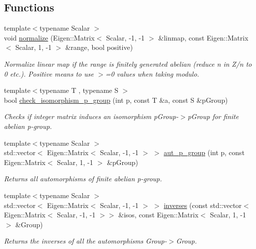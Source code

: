 \subsection*{Functions}
\begin{DoxyCompactItemize}
\item 
{\footnotesize template$<$typename Scalar $>$ }\\void \hyperlink{namespaceMackey_a5a3367c31144a61006d7c605d6e6ca38}{normalize} (Eigen\+::\+Matrix$<$ Scalar, -\/1, -\/1 $>$ \&linmap, const Eigen\+::\+Matrix$<$ Scalar, 1, -\/1 $>$ \&range, bool positive)
\begin{DoxyCompactList}\small\item\em Normalize linear map if the range is finitely generated abelian (reduce n in Z/n to 0 etc.). Positive means to use $>$=0 values when taking modulo. \end{DoxyCompactList}\item 
{\footnotesize template$<$typename T , typename S $>$ }\\bool \hyperlink{namespaceMackey_aa96cf972d89b207ce6709e867f760f37}{check\+\_\+isomorphism\+\_\+p\+\_\+group} (int p, const T \&a, const S \&p\+Group)
\begin{DoxyCompactList}\small\item\em Checks if integer matrix induces an isomorphism p\+Group-\/$>$p\+Group for finite abelian p-\/group. \end{DoxyCompactList}\item 
{\footnotesize template$<$typename Scalar $>$ }\\std\+::vector$<$ Eigen\+::\+Matrix$<$ Scalar, -\/1, -\/1 $>$ $>$ \hyperlink{namespaceMackey_ab3832e52497b387d4553af06aa26ec99}{aut\+\_\+p\+\_\+group} (int p, const Eigen\+::\+Matrix$<$ Scalar, 1, -\/1 $>$ \&p\+Group)
\begin{DoxyCompactList}\small\item\em Returns all automorphisms of finite abelian p-\/group. \end{DoxyCompactList}\item 
{\footnotesize template$<$typename Scalar $>$ }\\std\+::vector$<$ Eigen\+::\+Matrix$<$ Scalar, -\/1, -\/1 $>$ $>$ \hyperlink{namespaceMackey_ac8552763cbbe02f22cedc11c6f8434da}{inverses} (const std\+::vector$<$ Eigen\+::\+Matrix$<$ Scalar, -\/1, -\/1 $>$$>$ \&isos, const Eigen\+::\+Matrix$<$ Scalar, 1, -\/1 $>$ \&Group)
\begin{DoxyCompactList}\small\item\em Returns the inverses of all the automorphisms Group-\/$>$Group. \end{DoxyCompactList}\item 
$$
\end{DoxyCompactItemize}
